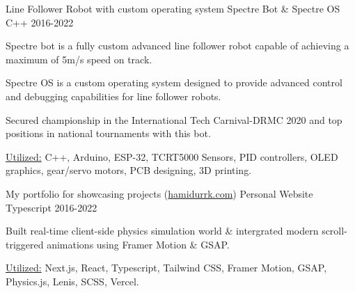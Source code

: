 \begin{cventries}
      \cventryprojects
      {Line Follower Robot with custom operating system} %
      {Spectre Bot \& Spectre OS} %
      {C++} %
      {2016-2022} %
      {
        \begin{cvitems} %
          \item {Spectre bot is a fully custom advanced line 
          follower robot capable of achieving a maximum of 5m/s speed on track.}
          \item {Spectre OS is a custom operating system designed to provide advanced control and 
          debugging capabilities for line follower robots.}
          \item {Secured championship in the International Tech Carnival-DRMC 2020 and top positions in national tournaments with this bot.}
          \item {\underline{Utilized:} C++, Arduino, ESP-32, TCRT5000 Sensors, PID controllers, OLED graphics, gear/servo motors, PCB designing, 3D printing.}
        \end{cvitems}
        }
        
      \cventryprojects
      {My portfolio for showcasing projects  (\href{https://hamidurrk.com}{hamidurrk.com})} %
      {Personal Website} %
      {Typescript} %
      {2016-2022} %
      {
        \begin{cvitems}
          \item {Built real-time client-side physics simulation world \& intergrated modern scroll-triggered animations using Framer Motion \& GSAP.}
          \item {\underline{Utilized:} Next.js, React, Typescript, Tailwind CSS, Framer Motion, GSAP, Physics.js, Lenis, SCSS, Vercel.}
        \end{cvitems}
        }
\end{cventries}
